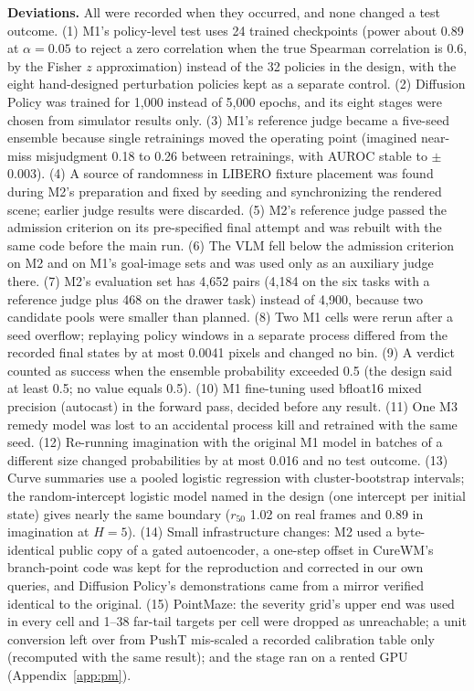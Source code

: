 \documentclass[10pt]{article}
\begin{document}
\textbf{Deviations.} All were recorded when they occurred, and none changed a test outcome. (1) M1's policy-level test uses 24 trained checkpoints (power about 0.89 at $\alpha=0.05$ to reject a zero correlation when the true Spearman correlation is 0.6, by the Fisher $z$ approximation) instead of the 32 policies in the design, with the eight hand-designed perturbation policies kept as a separate control. (2) Diffusion Policy was trained for 1,000 instead of 5,000 epochs, and its eight stages were chosen from simulator results only. (3) M1's reference judge became a five-seed ensemble because single retrainings moved the operating point (imagined near-miss misjudgment 0.18 to 0.26 between retrainings, with AUROC stable to $\pm$0.003). (4) A source of randomness in LIBERO fixture placement was found during M2's preparation and fixed by seeding and synchronizing the rendered scene; earlier judge results were discarded. (5) M2's reference judge passed the admission criterion on its pre-specified final attempt and was rebuilt with the same code before the main run. (6) The VLM fell below the admission criterion on M2 and on M1's goal-image sets and was used only as an auxiliary judge there. (7) M2's evaluation set has 4,652 pairs (4,184 on the six tasks with a reference judge plus 468 on the drawer task) instead of 4,900, because two candidate pools were smaller than planned. (8) Two M1 cells were rerun after a seed overflow; replaying policy windows in a separate process differed from the recorded final states by at most 0.0041 pixels and changed no bin. (9) A verdict counted as success when the ensemble probability exceeded 0.5 (the design said at least 0.5; no value equals 0.5). (10) M1 fine-tuning used bfloat16 mixed precision (autocast) in the forward pass, decided before any result. (11) One M3 remedy model was lost to an accidental process kill and retrained with the same seed. (12) Re-running imagination with the original M1 model in batches of a different size changed probabilities by at most 0.016 and no test outcome. (13) Curve summaries use a pooled logistic regression with cluster-bootstrap intervals; the random-intercept logistic model named in the design (one intercept per initial state) gives nearly the same boundary ($r_{50}$ 1.02 on real frames and 0.89 in imagination at $H=5$). (14) Small infrastructure changes: M2 used a byte-identical public copy of a gated autoencoder, a one-step offset in CureWM's branch-point code was kept for the reproduction and corrected in our own queries, and Diffusion Policy's demonstrations came from a mirror verified identical to the original. (15) PointMaze: the severity grid's upper end was used in every cell and 1--38 far-tail targets per cell were dropped as unreachable; a unit conversion left over from PushT mis-scaled a recorded calibration table only (recomputed with the same result); and the stage ran on a rented GPU (Appendix~\ref{app:pm}).
\end{document}
